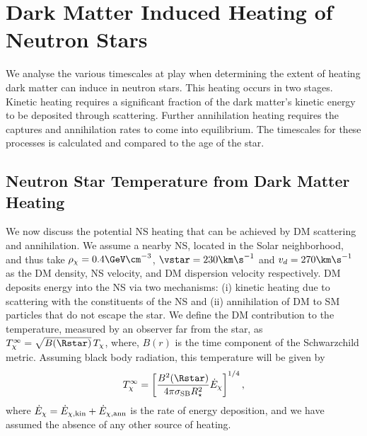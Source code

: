 \graphicspath{{img/thermalisation/}}

\chapter{Dark Matter Induced Heating of Neutron Stars}
\label{chapter:heating}

\begin{synopsis}
  We analyse the various timescales at play when determining the extent of heating dark matter can induce in neutron stars. This heating occurs in two stages. Kinetic heating requires a significant fraction of the dark matter's kinetic energy to be deposited through scattering. Further annihilation heating requires the captures and annihilation rates to come into equilibrium. The timescales for these processes is calculated and compared to the age of the star. 
\end{synopsis}








\section{Neutron Star Temperature from Dark Matter  Heating}
\label{sec:temperature}

We now discuss the potential NS heating that can be achieved by DM scattering and annihilation. 
We assume a nearby NS, located in the Solar neighborhood, and thus take $\rho_\chi=0.4\GeV\cm^{-3}$, $\vstar=230\km\s^{-1}$ and $v_d=270\km\s^{-1}$ as the DM density, NS velocity, and DM dispersion velocity respectively. 
%
DM deposits energy into the NS via two mechanisms: (i) kinetic heating due to scattering with the constituents of the NS and (ii) annihilation of DM to SM particles that do not escape the star. 
We define the DM contribution to the temperature, measured by an observer far from the star, as $T^\infty_{\chi}=\sqrt{B(\Rstar)} \, T_\chi$, where, $B(r)$ is the time component of the Schwarzchild metric.  
Assuming black body radiation, this temperature will be given by 
\begin{equation}
  T^\infty_{\chi}  = \left[\frac{B^2(\Rstar)}{4\pi\sigma_\text{SB} R_\star^2} \dot{E}_{\chi}  \right]^{1/4},
  \label{eq:Tkin} 
\end{equation}
where $\dot E_{\chi}= \dot E_{\chi, \rm kin} + \dot E_{\chi, \rm ann}$ is the rate of energy deposition, and we have assumed the absence of any other source of heating. 


